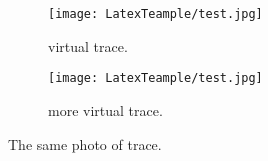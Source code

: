 \documentclass{article}
\begin{document}
    \begin{figure}[h!]
        \centering
        \begin{subfigure}[b]{0.4\linewidth}
            \texttt{[image: LatexTeample/test.jpg]}
            \caption{virtual trace.}
        \end{subfigure}
        \begin{subfigure}[b]{0.5\linewidth}
            \texttt{[image: LatexTeample/test.jpg]}
            \caption{more virtual trace.}
        \end{subfigure}
        \caption{The same photo of trace.}
        \label{fig:trace}
    \end{figure}

\end{document}
